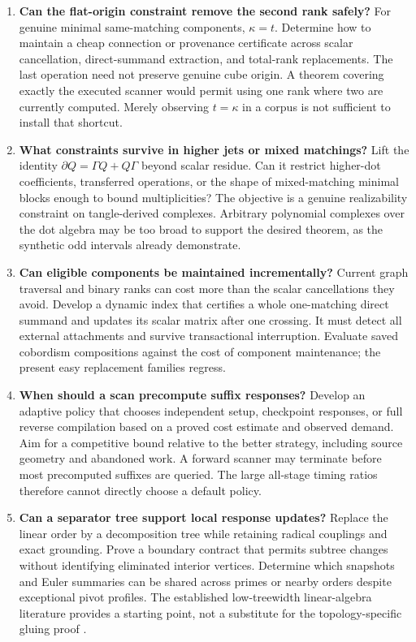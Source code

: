 \begin{enumerate}[label=\textbf{Q\arabic*.},leftmargin=3em,start=12]
\item \textbf{Can the flat-origin constraint remove the second rank safely?}
For genuine minimal same-matching components, $\kappa=t$. Determine how
to maintain a cheap connection or provenance certificate across scalar
cancellation, direct-summand extraction, and total-rank replacements.
The last operation need not preserve genuine cube origin. A theorem
covering exactly the executed scanner would permit using one rank where
two are currently computed. Merely observing $t=\kappa$ in a corpus is
not sufficient to install that shortcut.

\item \textbf{What constraints survive in higher jets or mixed matchings?}
Lift the identity $\partial Q=\Gamma Q+Q\Gamma$ beyond scalar residue.
Can it restrict higher-dot coefficients, transferred operations, or the
shape of mixed-matching minimal blocks enough to bound multiplicities?
The objective is a genuine realizability constraint on tangle-derived
complexes. Arbitrary polynomial complexes over the dot algebra may be
too broad to support the desired theorem, as the synthetic odd intervals
already demonstrate.

\item \textbf{Can eligible components be maintained incrementally?}
Current graph traversal and binary ranks can cost more than the scalar
cancellations they avoid. Develop a dynamic index that certifies a
whole one-matching direct summand and updates its scalar matrix after one
crossing. It must detect all external attachments and survive transactional
interruption. Evaluate saved cobordism compositions against the cost of
component maintenance; the present easy replacement families regress.

\item \textbf{When should a scan precompute suffix responses?}
Develop an adaptive policy that chooses independent setup, checkpoint
responses, or full reverse compilation based on a proved cost estimate
and observed demand. Aim for a competitive bound relative to the better
strategy, including source geometry and abandoned work. A forward scanner
may terminate before most precomputed suffixes are queried. The large
all-stage timing ratios therefore cannot directly choose a default policy.

\item \textbf{Can a separator tree support local response updates?}
Replace the linear order by a decomposition tree while retaining radical
couplings and exact grounding. Prove a boundary contract that permits
subtree changes without identifying eliminated interior vertices. Determine
which snapshots and Euler summaries can be shared across primes or nearby
orders despite exceptional pivot profiles. The established low-treewidth
linear-algebra literature provides a starting point, not a substitute for
the topology-specific gluing proof \cite{furer-hoppen-trevisan}.
\end{enumerate}

